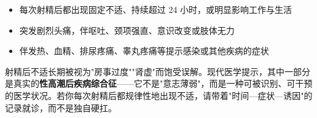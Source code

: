 \begin{itemize}[leftmargin=2cm]
	\item 每次射精后都出现固定不适、持续超过 24 小时，或明显影响工作与生活
	\item 突发剧烈头痛，伴呕吐、颈项强直、意识改变或肢体无力
	\item 伴发热、血精、排尿疼痛、睾丸疼痛等提示感染或其他疾病的症状
\end{itemize}

\begin{tcolorbox}[colback=pink!5!white,colframe=red!50!black,title=贴心小叮咛]
射精后不适长期被视为"房事过度""肾虚"而饱受误解。现代医学提示，其中一部分是真实的\textbf{性高潮后疾病综合征}——它不是"意志薄弱"，而是一种可被识别、可干预的医学状况。若你每次射精后都规律性地出现不适，请带着"时间—症状—诱因"的记录就诊，而不是独自硬扛。
\end{tcolorbox}
